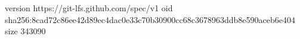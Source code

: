 version https://git-lfs.github.com/spec/v1
oid sha256:8cad72c86ee42d89ec4dac0e33c70b30900cc68c3678963ddb8e590aceb6e404
size 343090
